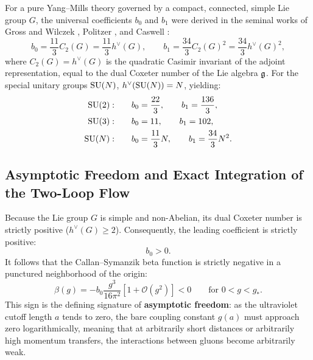 For a pure Yang--Mills theory governed by a compact, connected, simple Lie group $G$, the universal coefficients $b_0$ and $b_1$ were derived in the seminal works of Gross and Wilczek \cite{GrossWilczek1973}, Politzer \cite{Politzer1973}, and Caswell \cite{Caswell1974}:
\begin{equation}
\label{eq:universal_b0_b1}
b_0 = \frac{11}{3} C_2(G) = \frac{11}{3} h^\vee(G), \qquad b_1 = \frac{34}{3} C_2(G)^2 = \frac{34}{3} h^\vee(G)^2,
\end{equation}
where $C_2(G) = h^\vee(G)$ is the quadratic Casimir invariant of the adjoint representation, equal to the dual Coxeter number of the Lie algebra $\mathfrak{g}$. For the special unitary groups $\mathrm{SU}(N)$, $h^\vee(\mathrm{SU}(N)) = N$, yielding:
\begin{align}
\mathrm{SU}(2): \qquad & b_0 = \frac{22}{3}, \qquad b_1 = \frac{136}{3}, \label{eq:su2_b0_b1} \\
\mathrm{SU}(3): \qquad & b_0 = 11, \qquad b_1 = 102, \label{eq:su3_b0_b1} \\
\mathrm{SU}(N): \qquad & b_0 = \frac{11}{3} N, \qquad b_1 = \frac{34}{3} N^2. \label{eq:sun_b0_b1}
\end{align}

\subsection{Asymptotic Freedom and Exact Integration of the Two-Loop Flow}
\label{subsec:asymptotic_freedom_integration}

Because the Lie group $G$ is simple and non-Abelian, its dual Coxeter number is strictly positive ($h^\vee(G) \ge 2$). Consequently, the leading coefficient is strictly positive:
\begin{equation}
b_0 > 0.
\end{equation}
It follows that the Callan--Symanzik beta function is strictly negative in a punctured neighborhood of the origin:
\begin{equation}
\beta(g) = -b_0 \frac{g^3}{16\pi^2} \left[ 1 + \mathcal{O}(g^2) \right] < 0 \qquad \text{for } 0 < g < g_*.
\end{equation}
This sign is the defining signature of \textbf{asymptotic freedom}: as the ultraviolet cutoff length $a$ tends to zero, the bare coupling constant $g(a)$ must approach zero logarithmically, meaning that at arbitrarily short distances or arbitrarily high momentum transfers, the interactions between gluons become arbitrarily weak.

